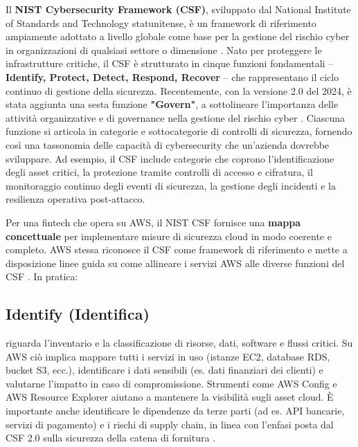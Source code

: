 \documentclass[a4paper,12pt]{report}
\begin{document}
Il \textbf{NIST Cybersecurity Framework (CSF)}, sviluppato dal National Institute of Standards and Technology statunitense, è un framework di riferimento ampiamente adottato a livello globale come base per la gestione del rischio cyber in organizzazioni di qualsiasi settore o dimensione \cite{awsNist}. Nato per proteggere le infrastrutture critiche, il CSF è strutturato in cinque funzioni fondamentali – \textbf{Identify, Protect, Detect, Respond, Recover} – che rappresentano il ciclo continuo di gestione della sicurezza. Recentemente, con la versione 2.0 del 2024, è stata aggiunta una sesta funzione \textbf{"Govern"}, a sottolineare l'importanza delle attività organizzative e di governance nella gestione del rischio cyber \cite{awsWhitepaper}. Ciascuna funzione si articola in categorie e sottocategorie di controlli di sicurezza, fornendo così una tassonomia delle capacità di cybersecurity che un'azienda dovrebbe sviluppare. Ad esempio, il CSF include categorie che coprono l'identificazione degli asset critici, la protezione tramite controlli di accesso e cifratura, il monitoraggio continuo degli eventi di sicurezza, la gestione degli incidenti e la resilienza operativa post-attacco.

Per una fintech che opera su AWS, il NIST CSF fornisce una \textbf{mappa concettuale} per implementare misure di sicurezza cloud in modo coerente e completo. AWS stessa riconosce il CSF come framework di riferimento e mette a disposizione linee guida su come allineare i servizi AWS alle diverse funzioni del CSF \cite{awsWhitepaper}. In pratica:

\subsection{Identify (Identifica)}
\label{subsec:nist_csf_identify}
riguarda l'inventario e la classificazione di risorse, dati, software e flussi critici. Su AWS ciò implica mappare tutti i servizi in uso (istanze EC2, database RDS, bucket S3, ecc.), identificare i dati sensibili (es. dati finanziari dei clienti) e valutarne l'impatto in caso di compromissione. Strumenti come AWS Config e AWS Resource Explorer aiutano a mantenere la visibilità sugli asset cloud. È importante anche identificare le dipendenze da terze parti (ad es. API bancarie, servizi di pagamento) e i rischi di supply chain, in linea con l'enfasi posta dal CSF 2.0 sulla sicurezza della catena di fornitura \cite{awsWhitepaper}.
\end{document}

